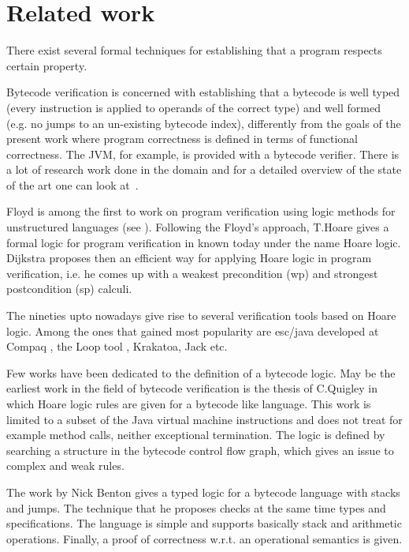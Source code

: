\section{Related work} \label{relWorkWp}

There exist several formal techniques for establishing that a program respects certain property.

 Bytecode verification is concerned with establishing that a bytecode is well typed 
(every instruction is applied to operands of the correct type) and well formed 
(e.g. no jumps to an un-existing bytecode index), differently from the goals of the present
work where program correctness is defined in terms of functional correctness. The JVM, for example, 
is provided with a bytecode verifier. There is a lot of research work done in the domain 
and for a detailed overview of the state of the art one can look at~\cite{Ljbc}.  

Floyd is among the first to work on program verification using logic methods for unstructured languages (see \cite{F67amp}).
Following the Floyd's approach, T.Hoare gives a formal logic for program verification in \cite{Hoare69ABC} known
 today under the name Hoare logic.
Dijkstra \cite{WPCDS} proposes then an efficient way for applying Hoare logic in program verification, i.e. he comes up with a
 weakest precondition (wp) and strongest postcondition (sp) calculi. 

The nineties upto nowadays give rise to several verification tools based on Hoare logic. Among the ones that gained most popularity are
esc/java developed at Compaq \cite{escjava}, the Loop tool \cite{jacobs03java}, Krakatoa, Jack \cite{BRL-JACK} etc.   

Few works have been dedicated to the definition of a bytecode logic. May be the earliest work in the field of bytecode verification 
is the thesis of C.Quigley  \cite{Quigley03PLJ} in which Hoare logic rules are given for a bytecode like language. This work is limited 
to a subset of the Java virtual machine instructions and does not treat for example method calls,
 neither exceptional termination. The logic is defined by searching a structure in the bytecode control flow graph,
 which gives an issue to complex and weak rules.

The work by Nick Benton \cite{B04tlsj} gives a  typed logic for a bytecode language with stacks and jumps. 
The technique that he proposes checks at the same time types and specifications.
The language is simple and supports basically stack and arithmetic operations. Finally, a proof of correctness
w.r.t. an operational semantics is given.


